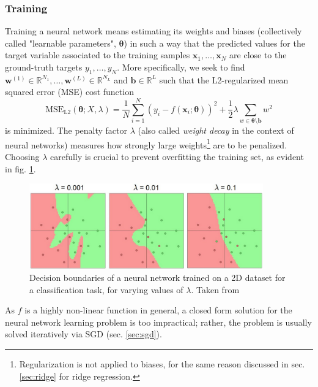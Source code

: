\subsubsection{Training}
\label{sec:training_nn}
Training a neural network means estimating its weights and biases (collectively called "learnable parameters", $\bm{\theta}$) in such a way that the predicted values for the target variable associated to the training samples $\mathbf{x}_{1},\dots,\mathbf{x}_{N}$ are close to the ground-truth targets $y_1,\dots,y_N$. More specifically, we seek to find $\mathbf{w}^{(1)} \in \mathbb{R}^{N_1},\dots,\mathbf{w}^{(L)} \in \mathbb{R}^{N_L}$ and $\mathbf{b} \in \mathbb{R}^L$ such that the L2-regularized mean squared error (MSE) cost function
\begin{equation}
\text{MSE}_\text{L2}(\bm{\theta};X,\lambda) = \frac{1}{N} \sum_{i=1}^N(y_i-f(\mathbf{x}_{i};\bm{\theta}))^2 + \frac{1}{2}\lambda \sum_{w\in \bm{\theta} \setminus \mathbf{b}} w^2
\end{equation}
is minimized. The penalty factor $\lambda$ (also called \textit{weight decay} in the context of neural networks) measures how strongly large weights\footnote{Regularization is not applied to biases, for the same reason discussed in sec. \ref{sec:ridge} for ridge regression.} are to be penalized. Choosing $\lambda$ carefully is crucial to prevent overfitting the training set, as evident in fig. \ref{fig:lambda_nn}.

\begin{figure}[hbt!]
    \centering
    \includegraphics[width=0.9\textwidth]{images/lambda_nn}
    \caption[Decision boundaries of a NN for classification]{Decision boundaries of a neural network trained on a 2D dataset for a classification task, for varying values of $\lambda$. Taken from \cite{cs231n:nn1}}
    \label{fig:lambda_nn}
\end{figure}

As $f$ is a highly non-linear function in general, a closed form solution for the neural network learning problem is too impractical; rather, the problem is usually solved iteratively via SGD (sec. \ref{sec:sgd}).

